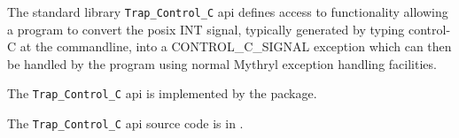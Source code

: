 
The standard library {\tt Trap\_Control\_C} api defines access to functionality allowing 
a program to convert the posix {\sc INT} signal, typically generated by typing 
control-C at the commandline, into a {\sc CONTROL\_C\_SIGNAL} exception which can then be 
handled by the program using normal Mythryl exception handling facilities.

The {\tt Trap\_Control\_C} api is implemented by the  package.

The {\tt Trap\_Control\_C} api source code is in .

